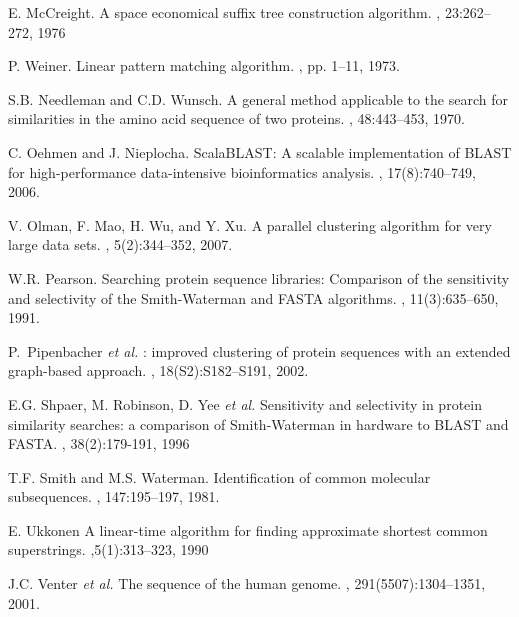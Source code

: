 \documentclass[10pt,journal,letterpaper,compsoc]{IEEEtran}
\begin{document}
\begin{thebibliography}{1}
E. McCreight.
\newblock A space economical suffix tree construction algorithm.
, 23:262--272, 1976


P. Weiner.
\newblock Linear pattern matching algorithm.
, pp. 1--11, 1973.

S.B. Needleman and C.D. Wunsch.
\newblock A general method applicable to the search for similarities in the
  amino acid sequence of two proteins.
, 48:443--453, 1970.


C. Oehmen and J. Nieplocha.
\newblock ScalaBLAST: A scalable implementation of BLAST for high-performance data-intensive bioinformatics analysis.
, 17(8):740--749, 2006.


V. Olman, F. Mao, H. Wu, and Y. Xu.
\newblock A parallel clustering algorithm for very large data sets.
, 5(2):344--352, 2007.


W.R. Pearson.
\newblock Searching protein sequence libraries: Comparison of the sensitivity and selectivity of the Smith-Waterman and FASTA algorithms.
, 11(3):635--650, 1991.

P.~Pipenbacher {\it et al.}
: improved clustering of protein sequences with an extended graph-based approach.
, 18(S2):S182--S191, 2002.


E.G. Shpaer, M. Robinson, D. Yee {\it et al.}
\newblock Sensitivity and selectivity in protein similarity searches: a comparison of Smith-Waterman in hardware to BLAST and FASTA.
, 38(2):179-191, 1996

T.F. Smith and M.S. Waterman.
\newblock Identification of common molecular subsequences.
, 147:195--197, 1981.

E. Ukkonen
\newblock A linear-time algorithm for finding approximate shortest common superstrings.
,5(1):313--323, 1990

J.C. Venter {\it et al.}
\newblock The sequence of the human genome.
, 291(5507):1304--1351, 2001.



\end{thebibliography}
\end{document}

